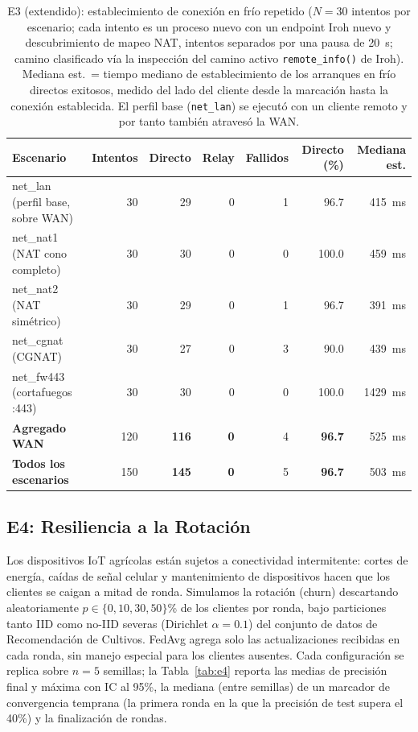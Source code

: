 \documentclass[journal]{IEEEtran}
\begin{document}
\begin{table}[t]
\centering
\caption{E3 (extendido): establecimiento de conexión en frío repetido ($N{=}30$ intentos por escenario; cada intento es un proceso nuevo con un endpoint Iroh nuevo y descubrimiento de mapeo NAT, intentos separados por una pausa de 20~s; camino clasificado vía la inspección del camino activo \texttt{remote\_info()} de Iroh). Mediana est.\ = tiempo mediano de establecimiento de los arranques en frío directos exitosos, medido del lado del cliente desde la marcación hasta la conexión establecida. El perfil base (\texttt{net\_lan}) se ejecutó con un cliente remoto y por tanto también atravesó la WAN.}
\label{tab:e3est}
\footnotesize
\begin{tabular}{l r r r r r r}
\toprule
\textbf{Escenario} & \textbf{Intentos} & \textbf{Directo} & \textbf{Relay} & \textbf{Fallidos} & \textbf{Directo (\%)} & \textbf{Mediana est.} \\
\midrule
net\_lan   (perfil base, sobre WAN) & 30  & 29  & 0 & 1 & 96.7  & 415~ms  \\
net\_nat1  (NAT cono completo) & 30  & 30  & 0 & 0 & 100.0 & 459~ms  \\
net\_nat2  (NAT simétrico)    & 30  & 29  & 0 & 1 & 96.7  & 391~ms  \\
net\_cgnat (CGNAT)            & 30  & 27  & 0 & 3 & 90.0  & 439~ms  \\
net\_fw443 (cortafuegos :443) & 30  & 30  & 0 & 0 & 100.0 & 1429~ms \\
\midrule
\textbf{Agregado WAN}         & 120 & \textbf{116} & \textbf{0} & 4 & \textbf{96.7} & 525~ms \\
\textbf{Todos los escenarios} & 150 & \textbf{145} & \textbf{0} & 5 & \textbf{96.7} & 503~ms \\
\bottomrule
\end{tabular}
\end{table}

\subsection{E4: Resiliencia a la Rotación}
\label{sec:e4}

Los dispositivos IoT agrícolas están sujetos a conectividad intermitente: cortes de energía, caídas de señal celular y mantenimiento de dispositivos hacen que los clientes se caigan a mitad de ronda. Simulamos la rotación (churn) descartando aleatoriamente $p \in \{0, 10, 30, 50\}$\% de los clientes por ronda, bajo particiones tanto IID como no-IID severas (Dirichlet $\alpha{=}0.1$) del conjunto de datos de Recomendación de Cultivos. FedAvg agrega solo las actualizaciones recibidas en cada ronda, sin manejo especial para los clientes ausentes. Cada configuración se replica sobre $n{=}5$ semillas; la Tabla~\ref{tab:e4} reporta las medias de precisión final y máxima con IC al 95\%, la mediana (entre semillas) de un marcador de convergencia temprana (la primera ronda en la que la precisión de test supera el 40\%) y la finalización de rondas.
\end{document}
